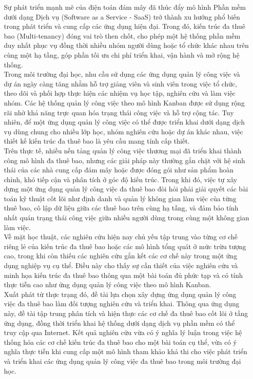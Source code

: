 Sự phát triển mạnh mẽ của điện toán đám mây đã thúc đẩy mô hình Phần mềm dưới dạng Dịch vụ (Software as a Service - SaaS) trở thành xu hướng phổ biến trong phát triển và cung cấp các ứng dụng hiện đại. Trong đó, kiến trúc đa thuê bao (Multi-tenancy) đóng vai trò then chốt, cho phép một hệ thống phần mềm duy nhất phục vụ đồng thời nhiều nhóm người dùng hoặc tổ chức khác nhau trên cùng một hạ tầng, góp phần tối ưu chi phí triển khai, vận hành và mở rộng hệ thống.\\
Trong môi trường đại học, nhu cầu sử dụng các ứng dụng quản lý công việc và dự án ngày càng tăng nhằm hỗ trợ giảng viên và sinh viên trong việc tổ chức, theo dõi và phối hợp thực hiện các nhiệm vụ học tập, nghiên cứu và làm việc nhóm. Các hệ thống quản lý công việc theo mô hình Kanban được sử dụng rộng rãi nhờ khả năng trực quan hóa trạng thái công việc và hỗ trợ cộng tác. Tuy nhiên, để một ứng dụng quản lý công việc có thể được triển khai dưới dạng dịch vụ dùng chung cho nhiều lớp học, nhóm nghiên cứu hoặc dự án khác nhau, việc thiết kế kiến trúc đa thuê bao là yêu cầu mang tính cấp thiết.\\
Trên thực tế, nhiều nền tảng quản lý công việc thương mại đã triển khai thành công mô hình đa thuê bao, nhưng các giải pháp này thường gắn chặt với hệ sinh thái của các nhà cung cấp đám mây hoặc được đóng gói như sản phẩm hoàn chỉnh, khó tiếp cận và phân tích ở góc độ kiến trúc. Trong khi đó, việc tự xây dựng một ứng dụng quản lý công việc đa thuê bao đòi hỏi phải giải quyết các bài toán kỹ thuật cốt lõi như định danh và quản lý không gian làm việc của từng thuê bao, cô lập dữ liệu giữa các thuê bao trên cùng hạ tầng, và đảm bảo tính nhất quán trạng thái công việc giữa nhiều người dùng trong cùng một không gian làm việc.\\
Về mặt học thuật, các nghiên cứu hiện nay chủ yếu tập trung vào từng cơ chế riêng lẻ của kiến trúc đa thuê bao hoặc các mô hình tổng quát ở mức trừu tượng cao, trong khi còn thiếu các nghiên cứu gắn kết các cơ chế này trong một ứng dụng nghiệp vụ cụ thể. Điều này cho thấy sự cần thiết của việc nghiên cứu và minh họa kiến trúc đa thuê bao thông qua một bài toán đủ phức tạp và có tính thực tiễn cao như ứng dụng quản lý công việc theo mô hình Kanban.\\
Xuất phát từ thực trạng đó, đề tài lựa chọn xây dựng ứng dụng quản lý công việc đa thuê bao làm đối tượng nghiên cứu và triển khai. Thông qua ứng dụng này, đề tài tập trung phân tích và hiện thực các cơ chế đa thuê bao cốt lõi ở tầng ứng dụng, đồng thời triển khai hệ thống dưới dạng dịch vụ phần mềm có thể truy cập qua Internet. Kết quả nghiên cứu vừa có ý nghĩa lý luận trong việc hệ thống hóa các cơ chế kiến trúc đa thuê bao cho một bài toán cụ thể, vừa có ý nghĩa thực tiễn khi cung cấp một mô hình tham khảo khả thi cho việc phát triển và triển khai các ứng dụng quản lý công việc đa thuê bao trong môi trường đại học.

